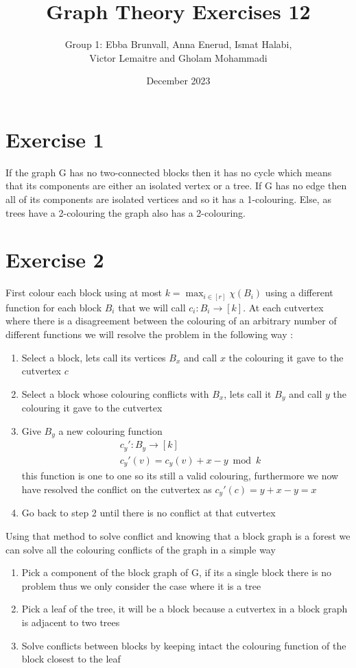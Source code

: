 \documentclass{article}
\title{Graph Theory Exercises 12}
\author{Group 1: Ebba Brunvall, Anna Enerud, Ismat Halabi, \\ Victor Lemaitre and Gholam Mohammadi}
\date{December 2023}
\begin{document}
\maketitle

\section*{Exercise 1}
If the graph G has no two-connected blocks then it has no cycle which means that its components are either an isolated vertex or a tree. If G has no edge then all of its components are isolated vertices and so it has a 1-colouring. Else, as trees have a 2-colouring the graph also has a 2-colouring. 

\section*{Exercise 2}
First colour each block using at most $k = \max_{i\in[r]} \chi(B_i)$ using a different function for each block $B_i$ that we will call $c_i : B_i \rightarrow [k]$.
At each cutvertex where there is a disagreement between the colouring of an arbitrary number of different functions we will resolve the problem in the following way :
\begin{enumerate}
\item Select a block, lets call its vertices $B_x$ and call $x$ the colouring it gave to the cutvertex $c$
\item Select a block whose colouring conflicts with $B_x$, lets call it $B_y$ and call $y$ the colouring it gave to the cutvertex
\item Give $B_y$ a new colouring function  
\begin{align*} 
&c_y' : B_y \rightarrow [k] \\ 
&c_y'(v) = c_y(v) + x-y \bmod{k}
\end{align*}
this function is one to one so its still a valid colouring, furthermore we now have resolved the conflict on the cutvertex as $c_y'(c) = y + x - y = x$
\item Go back to step 2 until there is no conflict at that cutvertex
\end{enumerate}

Using that method to solve conflict and knowing that a block graph is a forest we can solve all the colouring conflicts of the graph in a simple way 
\begin{enumerate}
\item Pick a component of the block graph of G, if its a single block there is no problem thus we only consider the case where it is a tree
\item Pick a leaf of the tree, it will be a block because a cutvertex in a block graph is adjacent to two trees
\item Solve conflicts between blocks by keeping intact the colouring function of the block closest to the leaf

\end{enumerate}
\end{document}
